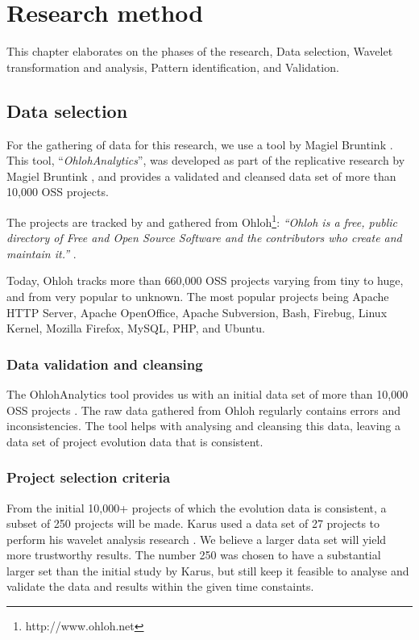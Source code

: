 \chapter{Research method}
\label{method}

This chapter elaborates on the phases of the research, Data selection, Wavelet
transformation and analysis, Pattern identification, and Validation.

\section{Data selection}
\label{method:data}

For the gathering of data for this research, we use a tool by Magiel Bruntink
\cite{ohlohanalytics}. This tool, ``\emph{OhlohAnalytics}\rm'', was developed as
part of the replicative research by Magiel Bruntink \cite{bruntink2014}, and
provides a validated and cleansed data set of more than 10,000 OSS projects.

The projects are tracked by and gathered from
Ohloh\footnote{http://www.ohloh.net}: \emph{``Ohloh is a free, public directory
of Free and Open Source Software and the contributors who create and maintain
it.'' }\rm \cite{ohloh}.

Today, Ohloh tracks more than 660,000 OSS projects varying from tiny to huge,
and from very popular to unknown. The most popular projects being Apache HTTP
Server, Apache OpenOffice, Apache Subversion, Bash, Firebug, Linux Kernel,
Mozilla Firefox, MySQL, PHP, and Ubuntu.

\subsection{Data validation and cleansing}
The OhlohAnalytics tool provides us with an initial data set of more than
10,000 OSS projects \cite{bruntink2014}. The raw data gathered from Ohloh
regularly contains errors and inconsistencies. The tool helps with analysing
and cleansing this data, leaving a data set of project evolution data that is
consistent.



\subsection{Project selection criteria}

From the initial 10,000+ projects of which the evolution data is consistent, a
subset of 250 projects will be made. Karus used a data set of 27 projects to
perform his wavelet analysis research \cite{karus2013}. We believe a larger
data set will yield more trustworthy results. The number 250 was chosen to have
a substantial larger set than the initial study by Karus, but still keep it
feasible to analyse and validate the data and results within the given time
constaints.

